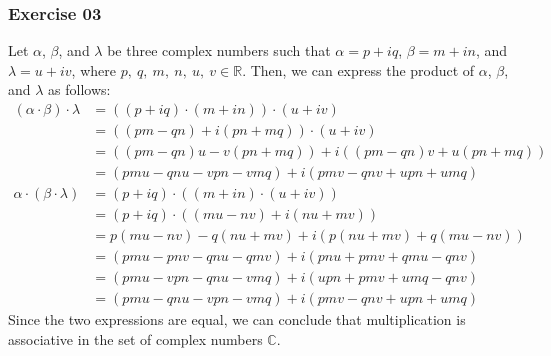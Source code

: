 \subsubsection*{Exercise 03}

\begin{flushleft}
Let $\alpha$, $\beta$, and $\lambda$ be three complex numbers such that $\alpha = p + iq$, $\beta  = m + in$, and $\lambda = u + iv$, where $p,\ q,\ m,\ n,\ u,\ v \in \mathbb{R}$. Then, we can express the product of $\alpha$, $\beta$, and $\lambda$ as follows:
\begin{align*}
(\alpha \cdot \beta) \cdot \lambda &= ((p + iq) \cdot (m + in)) \cdot (u + iv)               \\
                                   &= ((pm - qn) + i(pn + mq)) \cdot (u + iv)                \\
                                   &= ((pm - qn)u - v(pn + mq)) + i((pm - qn)v + u(pn + mq)) \\
                                   &= (pmu - qnu - vpn - vmq) + i(pmv - qnv + upn + umq)     \\
\alpha \cdot (\beta \cdot \lambda) &= (p + iq) \cdot ((m + in) \cdot (u + iv))               \\
                                   &= (p + iq) \cdot ((mu - nv) + i(nu + mv))                \\
                                   &= p(mu - nv) - q(nu + mv) + i(p(nu + mv) + q(mu - nv))   \\
                                   &= (pmu - pnv - qnu - qmv) + i(pnu + pmv + qmu - qnv)     \\
                                   &= (pmu - vpn - qnu - vmq) + i(upn + pmv + umq - qnv)     \\
                                   &= (pmu - qnu - vpn - vmq) + i(pmv - qnv + upn + umq)     
\end{align*}
Since the two expressions are equal, we can conclude that multiplication is associative in the set of complex numbers $\mathbb{C}$.
\end{flushleft}
